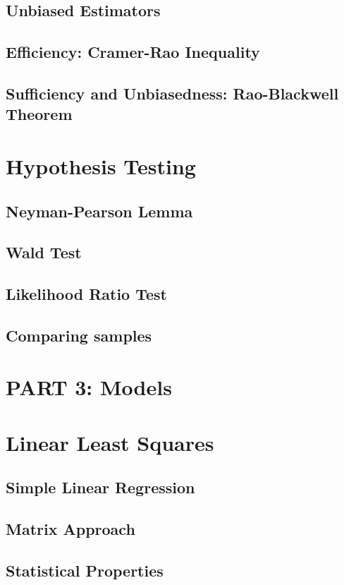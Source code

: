 \documentclass[
  openany]{book}
\theoremstyle{definition}
\theoremstyle{definition}
\theoremstyle{definition}
\theoremstyle{definition}
\theoremstyle{remark}
\begin{document}
\section{Unbiased Estimators}\label{unbiased-estimators}

\section{Efficiency: Cramer-Rao Inequality}\label{efficiency-cramer-rao-inequality}

\section{Sufficiency and Unbiasedness: Rao-Blackwell Theorem}\label{sufficiency-and-unbiasedness-rao-blackwell-theorem}

\chapter{Hypothesis Testing}\label{hypothesis-testing}

\section{Neyman-Pearson Lemma}\label{neyman-pearson-lemma}

\section{Wald Test}\label{wald-test}

\section{Likelihood Ratio Test}\label{likelihood-ratio-test}

\section{Comparing samples}\label{comparing-samples}

\chapter*{PART 3: Models}\label{part-3-models}


\chapter{Linear Least Squares}\label{linear-least-squares}

\section{Simple Linear Regression}\label{simple-linear-regression}

\section{Matrix Approach}\label{matrix-approach}

\section{Statistical Properties}\label{statistical-properties}
\end{document}
